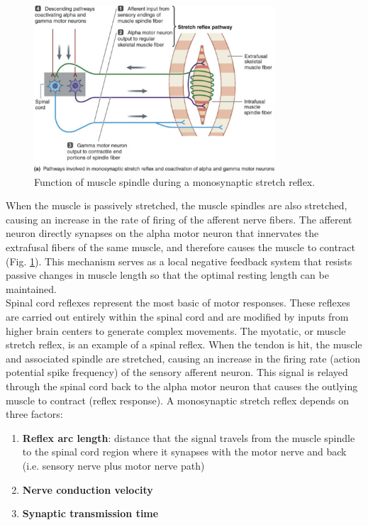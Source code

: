 \documentclass{article}
\begin{document}
\begin{figure}[h]
\centering
\includegraphics[width=0.8\textwidth]{../images/EMG_II_1.jpg}	
\caption{Function of muscle spindle during a monosynaptic stretch reflex.}
\label{spindle}
\end{figure}

When the muscle is passively stretched, the muscle spindles are also stretched, causing an increase in the rate of firing of the afferent nerve fibers. The afferent neuron directly synapses on the alpha motor neuron that innervates the extrafusal fibers of the same muscle, and therefore causes the muscle to contract (Fig. \ref{spindle}). This mechanism serves as a local negative feedback system that resists passive changes in muscle length so that the optimal resting length can be maintained.\\

Spinal cord reflexes represent the most basic of motor responses. These reflexes are carried out entirely within the spinal cord and are modified by inputs from higher brain centers to generate complex movements. The myotatic, or muscle stretch reflex, is an example of a spinal reflex. When the tendon is hit, the muscle and associated spindle are stretched, causing an increase in the firing rate (action potential spike frequency) of the sensory afferent neuron. This signal is relayed through the spinal cord back to the alpha motor neuron that causes the outlying muscle to contract (reflex response). A monosynaptic stretch reflex depends on three factors:

\begin{enumerate}
	\item \textbf{Reflex arc length}: distance that the signal travels from the muscle spindle to the spinal cord region where it synapses with the motor nerve and back (i.e. sensory nerve plus motor nerve path)
	\item \textbf{Nerve conduction velocity}
	\item \textbf{Synaptic transmission time}
\end{enumerate}
\end{document}
